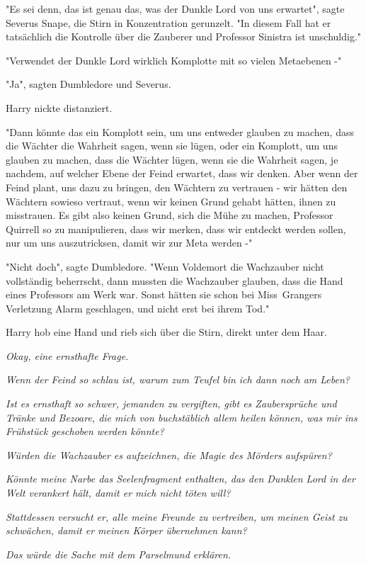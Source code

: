 {"Es sei denn, das ist genau das, was der Dunkle Lord von uns erwartet", sagte Severus Snape, die Stirn in Konzentration gerunzelt. "In diesem Fall hat er tatsächlich die Kontrolle über die Zauberer und Professor Sinistra ist unschuldig."

"Verwendet der Dunkle Lord wirklich Komplotte mit so vielen Metaebenen -"

"Ja", sagten Dumbledore und Severus.

Harry nickte distanziert.

"Dann könnte das ein Komplott sein, um uns entweder glauben zu machen, dass die Wächter die Wahrheit sagen, wenn sie lügen, oder ein Komplott, um uns glauben zu machen, dass die Wächter lügen, wenn sie die Wahrheit sagen, je nachdem, auf welcher Ebene der Feind erwartet, dass wir denken. Aber wenn der Feind plant, uns dazu zu bringen, den Wächtern zu vertrauen - wir hätten den Wächtern sowieso vertraut, wenn wir keinen Grund gehabt hätten, ihnen zu misstrauen. Es gibt also keinen Grund, sich die Mühe zu machen, Professor Quirrell so zu manipulieren, dass wir merken, dass wir entdeckt werden sollen, nur um uns auszutricksen, damit wir zur Meta werden -"

"Nicht doch", sagte Dumbledore. "Wenn Voldemort die Wachzauber nicht vollständig beherrscht, dann mussten die Wachzauber glauben, dass die Hand eines Professors am Werk war. Sonst hätten sie schon bei Miss~Grangers Verletzung Alarm geschlagen, und nicht erst bei ihrem Tod."

Harry hob eine Hand und rieb sich über die Stirn, direkt unter dem Haar.

\emph{Okay, eine ernsthafte Frage.}

\emph{Wenn der Feind so schlau ist, warum zum Teufel bin ich dann noch am Leben?}

\emph{Ist es ernsthaft so schwer, jemanden zu vergiften, gibt es Zaubersprüche und Tränke und Bezoare, die mich von buchstäblich allem heilen können, was mir ins Frühstück geschoben werden könnte?}

\emph{Würden die Wachzauber es aufzeichnen, die Magie des Mörders aufspüren?}

\emph{Könnte meine Narbe das Seelenfragment enthalten, das den Dunklen Lord in der Welt verankert hält, damit er mich nicht töten will?}

\emph{Stattdessen versucht er, alle meine Freunde zu vertreiben, um meinen Geist zu schwächen, damit er meinen Körper übernehmen kann?}

\emph{Das würde die Sache mit dem Parselmund erklären.}

}
